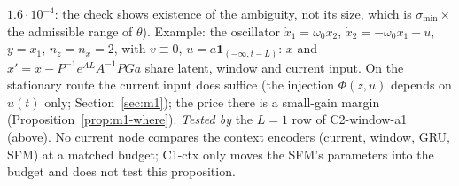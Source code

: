 $1.6\cdot10^{-4}$: the check shows existence of the ambiguity, not its size, which is $\sigma_{\min}\times$ the
admissible range of $\theta$). Example: the oscillator $\dot x_1=\omega_0x_2$, $\dot x_2=-\omega_0x_1+u$, $y=x_1$,
$n_z=n_x=2$, with $v\equiv0$, $u=a\mathbf 1_{(-\infty,t-L)}$: $x$ and $x'=x-P^{-1}e^{AL}A^{-1}PGa$ share latent, window
and current input. On the stationary route the current input does suffice (the injection $\Phi(z,u)$ depends on $u(t)$
only; Section~\ref{sec:m1}); the price there is a small-gain margin (Proposition~\ref{prop:m1-where}).
\emph{Tested by} the $L=1$ row of C2-window-a1 (above). No current node compares the context encoders (current, window,
GRU, SFM) at a matched budget; C1-ctx only moves the SFM's parameters into the budget and does not test this
proposition.

